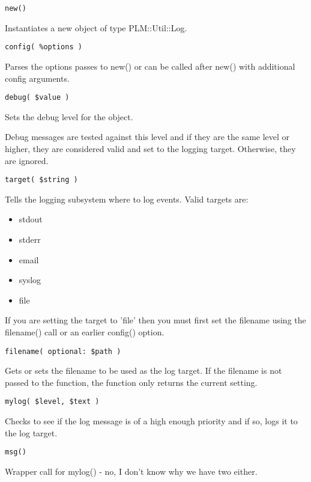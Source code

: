 \begin{verbatim}
new()
\end{verbatim}
Instantiates a new object of type PLM::Util::Log.

\begin{verbatim}
config( %options )
\end{verbatim}
Parses the options passes to new() or can be called after new() with additional config arguments.

\begin{verbatim}
debug( $value )
\end{verbatim}
Sets the debug level for the object.

Debug messages are tested against this level and if they are the same level or higher, they are considered valid and set to the logging target.  Otherwise, they are ignored.

\begin{verbatim}
target( $string )
\end{verbatim}
Tells the logging subsystem where to log events.  Valid targets are:

\begin{itemize}
\item stdout
\item stderr
\item email
\item syslog
\item file
\end{itemize}

If you are setting the target to 'file' then you must first set the filename using the filename() call or an earlier config() option.

\begin{verbatim}
filename( optional: $path )
\end{verbatim}
Gets or sets the filename to be used as the log target.  If the filename is not passed to the function, the function only returns the current setting.

\begin{verbatim}
mylog( $level, $text )
\end{verbatim}
Checks to see if the log message is of a high enough priority and if so, logs it to the log target.

\begin{verbatim}
msg()
\end{verbatim}
Wrapper call for mylog() - no, I don't know why we have two either.

